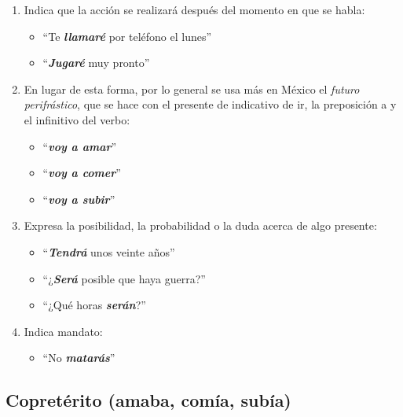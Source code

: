 \documentclass[14pt]{extarticle}
\newcommand{\marcatexto}[1]{\textbf{\textit{#1}}}
\begin{document}
\begin{enumerate}[label=\alph*)]
\item Indica que la acción se realizará después del momento en que se habla:
\begin{itemize}
\item \enquote{Te \marcatexto{llamaré} por teléfono el lunes}
\item \enquote{\marcatexto{Jugaré} muy pronto}
\end{itemize}
\item En lugar de esta forma, por lo general se usa más en México el \emph{futuro perifrástico}, que se hace con el presente de indicativo de ir, la preposición a y el infinitivo del verbo:
\begin{itemize}
\item \enquote{\marcatexto{voy a amar}}
\item \enquote{\marcatexto{voy a comer}}
\item \enquote{\marcatexto{voy a subir}}
\end{itemize}
\item Expresa la posibilidad, la probabilidad o la duda acerca de algo presente:
\begin{itemize}
\item \enquote{\marcatexto{Tendrá} unos veinte años}
\item \enquote{¿\marcatexto{Será} posible que haya guerra?}
\item \enquote{¿Qué horas \marcatexto{serán}?}
\end{itemize}
\item Indica mandato:
\begin{itemize}
\item \enquote{No \marcatexto{matarás}}
\end{itemize}
\end{enumerate}

\subsection{Copretérito (amaba, comía, subía)}
\end{document}
